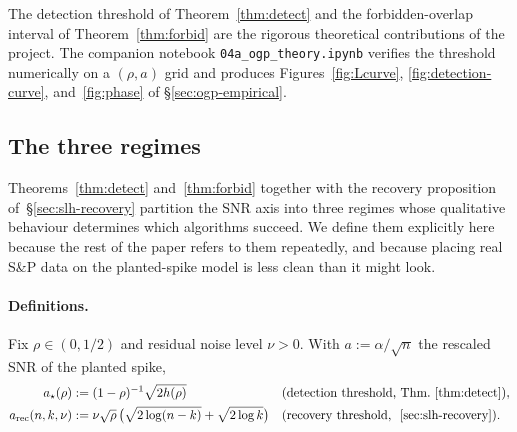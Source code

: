 The detection threshold of Theorem~\ref{thm:detect} and the forbidden-overlap interval
of Theorem~\ref{thm:forbid} are the rigorous theoretical contributions of the project.
The companion notebook \texttt{04a\_ogp\_theory.ipynb} verifies the threshold numerically
on a $(\rho, a)$ grid and produces Figures~\ref{fig:Lcurve},
\ref{fig:detection-curve}, and~\ref{fig:phase} of \S\ref{sec:ogp-empirical}.

\subsection{The three regimes}\label{sec:regimes}

Theorems~\ref{thm:detect} and~\ref{thm:forbid} together with the recovery proposition
of~\S\ref{sec:slh-recovery} partition the SNR axis into three regimes whose qualitative
behaviour determines which algorithms succeed. We define them explicitly here because
the rest of the paper refers to them repeatedly, and because placing real S\&P data on
the planted-spike model is less clean than it might look.
 
\paragraph{Definitions.}
Fix $\rho \in (0, 1/2)$ and residual noise level $\nu > 0$.
With $a := \alpha / \sqrt{n}$ the rescaled SNR of the planted spike,
\begin{align*}
   a_\star(\rho) &:= (1-\rho)^{-1}\sqrt{2 h(\rho)}
   && \text{(detection threshold, Thm.~\ref{thm:detect})},\\
   a_{\mathrm{rec}}(n,k,\nu) &:= \nu\sqrt{\rho}\,
       \bigl(\sqrt{2\log(n-k)} + \sqrt{2\log k}\bigr)
   && \text{(recovery threshold, ~\ref{sec:slh-recovery})}.
\end{align*}
 
